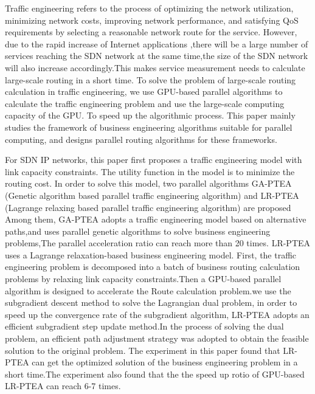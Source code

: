 \documentclass[master]{thesis-uestc}
\begin{document}
\begin{englishabstract}

Traffic engineering refers to the process of optimizing the network utilization, minimizing network costs, improving network performance, and satisfying QoS requirements by selecting a reasonable network route for the service. However, due to the rapid increase of Internet applications ,there will be a large number of services reaching the SDN network at the same time,the size of the SDN network will also increase accordingly.This makes service measurement needs to calculate large-scale routing in a short time. To solve the problem of large-scale routing calculation in traffic engineering, we use GPU-based parallel algorithms to calculate the traffic engineering problem and use the large-scale computing capacity of the GPU. To speed up the algorithmic process. This paper mainly studies the framework of business engineering algorithms suitable for parallel computing, and designs parallel routing algorithms for these frameworks.

For SDN IP networks, this paper first proposes a traffic engineering model with link capacity constraints. The utility function in the model is to minimize the routing cost. In order to solve this model, two parallel algorithms GA-PTEA (Genetic algorithm based parallel traffic engineering algorithm) and LR-PTEA (Lagrange relaxing based parallel traffic engineering algorithm) are proposed
Among them, GA-PTEA adopts a traffic engineering model based on alternative paths,and uses parallel genetic algorithms to solve business engineering problems,The parallel acceleration ratio can reach more than 20 times. LR-PTEA uses a Lagrange relaxation-based business engineering model. First, the traffic engineering problem is decomposed into a batch of business routing calculation problems by relaxing link capacity constraints.Then a GPU-based parallel algorithm is designed to accelerate the Route calculation problem.we use the subgradient descent method to solve the Lagrangian dual problem, in order to speed up the convergence rate of the subgradient algorithm, LR-PTEA adopts an efficient subgradient step update method.In the process of solving the dual problem, an efficient path adjustment strategy was adopted to obtain the feasible solution to the original problem. The experiment in this paper found that LR-PTEA can get the optimized solution of the business engineering problem in a short time.The experiment also found that the the speed up rotio of GPU-based LR-PTEA can reach 6-7 times.



\end{englishabstract}
\end{document}
